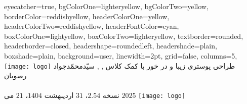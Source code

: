 \documentclass[landscape,debug,paperwidth=1510mm, paperheight=955mm,]{xebaposter}
\begin{document}
      \begin{poster}%
      {
      eyecatcher=true,
      bgColorOne=lighteryellow,%
      bgColorTwo=yellow,
      borderColor=reddishyellow,
      headerColorOne=yellow,
      headerColorTwo=reddishyellow,
      headerFontColor=cyan,
      boxColorOne=lightyellow,
      boxColorTwo=lighteryellow,
      textborder=rounded,
      headerborder=closed,
      headershape=roundedleft,
      headershade=plain,
      boxshade=plain,
      background=user,
      linewidth=2pt,
      grid=false, %
      columns=5,
      }
 {
      \texttt{[image: logo]}
 }
 {طراحی پوستری زیبا و در خور با کمک کلاس 
}
 {\large {}, , سیّدمحمّدجواد رضویان
 \\%
 {\normalsize\texttt{}
 \\
نسخه $2.54$، $31$ اردیبهشت $1404$، $21$ می $2025$
 }}
 {
    \texttt{[image: logo]}
 }


\end{poster}
\end{document}
